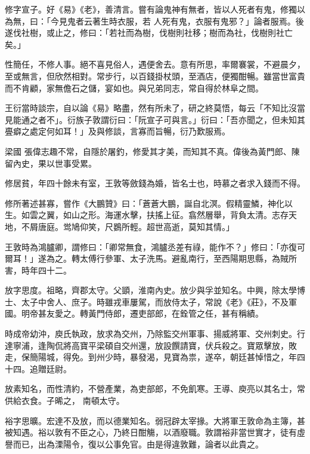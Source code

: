 \begin{pinyinscope}
 修字宣子。好《易》《老》，善清言。嘗有論鬼神有無者，皆以人死者有鬼，修獨以為無，曰：「今見鬼者云著生時衣服，若
 人死有鬼，衣服有鬼邪？」論者服焉。後遂伐社樹，或止之，修曰：「若社而為樹，伐樹則社移；樹而為社，伐樹則社亡矣。」



 性簡任，不修人事。絕不喜見俗人，遇便舍去。意有所思，率爾褰裳，不避晨夕，至或無言，但欣然相對。常步行，以百錢掛杖頭，至酒店，便獨酣暢。雖當世富貴而不肯顧，家無儋石之儲，宴如也。與兄弟同志，常自得於林阜之間。



 王衍當時談宗，自以論《易》略盡，然有所未了，研之終莫悟，每云「不知比沒當見能通之者不」。衍族子敦謂衍曰：「阮宣子可與言。」衍曰：「吾亦聞之，但未知其亹癖之處定何如耳！」及與修談，言寡而旨暢，衍乃歎服焉。



 梁國
 張偉志趣不常，自隱於屠釣，修愛其才美，而知其不真。偉後為黃門郎、陳留內史，果以世事受累。



 修居貧，年四十餘未有室，王敦等斂錢為婚，皆名士也，時慕之者求入錢而不得。



 修所著述甚寡，嘗作《大鵬贊》曰：「蒼蒼大鵬，誕自北溟。假精靈鱗，神化以生。如雲之翼，如山之形。海運水擊，扶搖上征。翕然層舉，背負太清。志存天地，不屑唐庭。鸴鳩仰笑，尺鷃所輕。超世高逝，莫知其情。」



 王敦時為鴻臚卿，謂修曰：「卿常無食，鴻臚丞差有祿，能作不？」修曰：「亦復可爾耳！」遂為之。轉太傅行參軍、太子洗馬。避亂南行，至西陽期思縣，為賊所害，時年四十二。



 放字思度。祖略，齊郡太守。父顗，淮南內史。放少與孚並知名。中興，除太學博士、太子中舍人、庶子。時雖戎車屢駕，而放侍太子，常說《老》《莊》，不及軍國。明帝甚友愛之。轉黃門侍郎，遷吏部郎，在銓管之任，甚有稱績。



 時成帝幼沖，庾氏執政，放求為交州，乃除監交州軍事、揚威將軍、交州刺史。行達寧浦，逢陶侃將高寶平梁碩自交州還，放設饌請寶，伏兵殺之。寶眾擊放，敗走，保簡陽城，得免。到州少時，暴發渴，見寶為祟，遂卒，朝廷甚悼惜之，年四十四。追贈廷尉。



 放素知名，而性清約，不營產業，為吏部郎，不免飢寒。王導、庾亮以其名士，常供給衣食。子晞之，
 南頓太守。



 裕字思曠。宏達不及放，而以德業知名。弱冠辟太宰掾。大將軍王敦命為主簿，甚被知遇。裕以敦有不臣之心，乃終日酣觴，以酒廢職。敦謂裕非當世實才，徒有虛譽而已，出為溧陽令，復以公事免官。由是得違敦難，論者以此貴之。




\end{pinyinscope}

